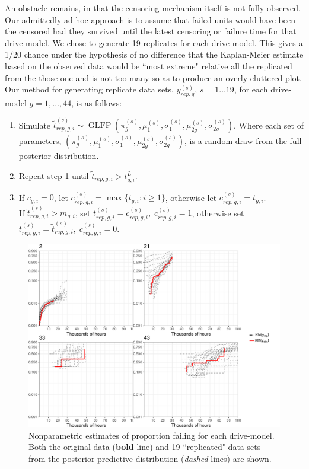 \documentclass[12pt]{article}
\newcommand{\op}{\operatorname}
\begin{document}
An obstacle remains, in that the censoring mechanism itself is not fully observed. Our admittedly ad hoc approach is to assume that failed units would have been the censored had they survived until the latest censoring or failure time for that drive model. We chose to generate 19 replicates for each drive model. This gives a 1/20 chance under the hypothesis of no difference that the Kaplan-Meier estimate based on the observed data would be ``most extreme" relative all the replicated  from the those one and is not too many so as to produce an overly cluttered plot. Our method for generating replicate data sets, $y_{rep,g}^{(s)}$, $s = 1 \dots 19$, for each drive-model $g=1,\ldots,44$, is as follows:
\begin{enumerate}
\item Simulate $\tilde{t}_{rep,g,i}^{(s)} \sim \op{GLFP}(\pi_{g}^{(s)},\mu_1^{(s)},\sigma_1^{(s)},\mu_{2g}^{(s)}, \sigma_{2g}^{(s)})$.  Where each set of parameters, $\left( \pi_{g}^{(s)},\mu_1^{(s)},\sigma_1^{(s)},\mu_{2g}^{(s)}, \sigma_{2g}^{(s)} \right) $, is a random draw from the full posterior distribution.
\item Repeat step 1 until $\tilde{t}_{rep,g,i} > t_{g,i}^L$.
\item If $c_{g,i}=0$, let $c_{rep,g,i}^{(s)}=\max \{t_{g,i}: i \ge 1\}$, otherwise let $c_{rep,g,i}^{(s)}=t_{g,i}$.\\
If $\tilde{t}_{rep,g,i}^{(s)}>m_{g,i}$, set $t_{rep,g,i}^{(s)}=c_{rep,g,i}^{(s)},\; c_{rep,g,i}^{(s)}=1$, otherwise set $t_{rep,g,i}^{(s)}=\tilde{t}_{rep,g,i}^{(s)},\; c_{rep,g,i}^{(s)}=0$.
\end{enumerate}

\begin{figure}[H]
\includegraphics[width=\textwidth]{ppcheck-sample}
\caption{Nonparametric estimates of proportion failing for each drive-model. Both the original data (\textbf{bold} line) and 19 ``replicated" data sets from the posterior predictive distribution (\textit{dashed} lines) are shown.}
\label{fig:post-pred-KM}
\end{figure}
\end{document}
